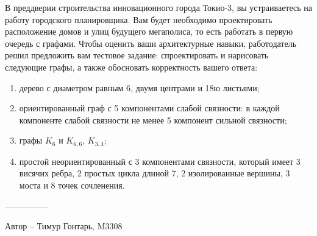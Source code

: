 \question
В преддверии строительства инновационного города Токио-3, вы устраиваетесь на работу городского планировщика. Вам будет необходимо проектировать расположение домов и улиц будущего мегаполиса, то есть работать в первую очередь с графами. Чтобы оценить ваши архитектурные навыки, работодатель решил предложить вам тестовое задание: спроектировать и нарисовать следующие графы, а также обосновать корректность вашего ответа:

\begin{enumerate}
\item  дерево с диаметром равным 6, двумя центрами  и  18ю листьями;
\item  ориентированный граф с 5 компонентами слабой связности: в  каждой компоненте слабой связности не менее 5 компонент сильной связности;
\item  графы $K_6$ и $K_{6,6}$, $K_{3,4}$;
\item  простой неориентированный с 3 компонентами связности, который имеет 3 висячих ребра, 2 простых цикла длиной 7, 2 изолированные вершины, 3 моста и 8 точек сочленения.
\end{enumerate}

---------------

Автор -- Тимур Гонтарь, M3308
